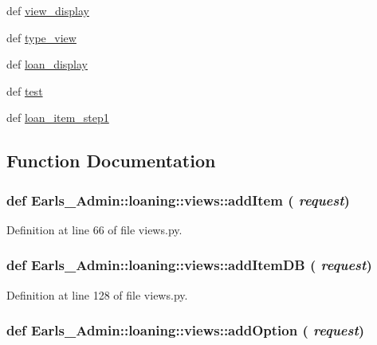 \begin{CompactItemize}
\item 
def \hyperlink{namespaceEarls__Admin_1_1loaning_1_1views_4a2f0a182dc4db45644feda0e5bc4d79}{view\_\-display}
\item 
def \hyperlink{namespaceEarls__Admin_1_1loaning_1_1views_81305e166b52f601c3577187de33a879}{type\_\-view}
\item 
def \hyperlink{namespaceEarls__Admin_1_1loaning_1_1views_3b2efb16aecb311fce49b4ff76a98a9d}{loan\_\-display}
\item 
def \hyperlink{namespaceEarls__Admin_1_1loaning_1_1views_030b87ca7f36b48e7bc4ca82ecfff1d3}{test}
\item 
def \hyperlink{namespaceEarls__Admin_1_1loaning_1_1views_6d3c5974ea74407eb68ad7685e51c863}{loan\_\-item\_\-step1}
\end{CompactItemize}


\subsection{Function Documentation}
\hypertarget{namespaceEarls__Admin_1_1loaning_1_1views_3279813171484182fab73cb8480aa310}{
\subsubsection[addItem]{\setlength{\rightskip}{0pt plus 5cm}def Earls\_\-Admin::loaning::views::addItem ( {\em request})}}
\label{namespaceEarls__Admin_1_1loaning_1_1views_3279813171484182fab73cb8480aa310}




Definition at line 66 of file views.py.\hypertarget{namespaceEarls__Admin_1_1loaning_1_1views_a770def5281ee18891797b16dfd815f6}{
\subsubsection[addItemDB]{\setlength{\rightskip}{0pt plus 5cm}def Earls\_\-Admin::loaning::views::addItemDB ( {\em request})}}
\label{namespaceEarls__Admin_1_1loaning_1_1views_a770def5281ee18891797b16dfd815f6}




Definition at line 128 of file views.py.\hypertarget{namespaceEarls__Admin_1_1loaning_1_1views_47906fb9f252ab205561f960435c6d26}{
\subsubsection[addOption]{\setlength{\rightskip}{0pt plus 5cm}def Earls\_\-Admin::loaning::views::addOption ( {\em request})}}
\label{namespaceEarls__Admin_1_1loaning_1_1views_47906fb9f252ab205561f960435c6d26}




